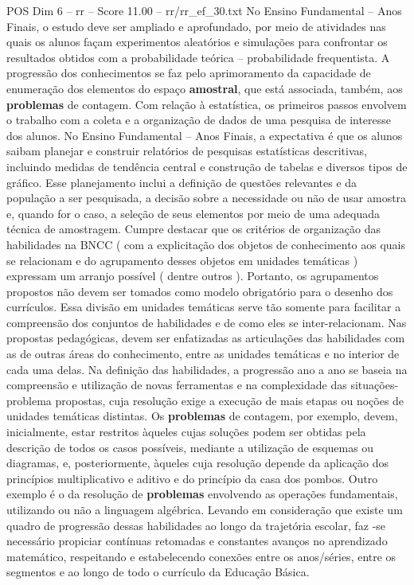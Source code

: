 \begin{textsample}{POS Dim 6 – rr – Score 11.00 – rr/rr\_ef\_30.txt}
No Ensino Fundamental – Anos Finais, o estudo deve ser ampliado e aprofundado, por meio de atividades nas quais os alunos façam experimentos aleatórios e simulações para confrontar os resultados obtidos com a probabilidade teórica – probabilidade frequentista.
A progressão dos conhecimentos se faz pelo aprimoramento da capacidade de enumeração dos elementos do espaço \textbf{amostral}, que está associada, também, aos \textbf{problemas} de contagem.
Com relação à estatística, os primeiros passos envolvem o trabalho com a coleta e a organização de dados de uma pesquisa de interesse dos alunos.
No Ensino Fundamental – Anos Finais, a expectativa é que os alunos saibam planejar e construir relatórios de pesquisas estatísticas descritivas, incluindo medidas de tendência central e construção de tabelas e diversos tipos de gráfico.
Esse planejamento inclui a definição de questões relevantes e da população a ser pesquisada, a decisão sobre a necessidade ou não de usar amostra e, quando for o caso, a seleção de seus elementos por meio de uma adequada técnica de amostragem.
Cumpre destacar que os critérios de organização das habilidades na BNCC ( com a explicitação dos objetos de conhecimento aos quais se relacionam e do agrupamento desses objetos em unidades temáticas ) expressam um arranjo possível ( dentre outros ).
Portanto, os agrupamentos propostos não devem ser tomados como modelo obrigatório para o desenho dos currículos.
Essa divisão em unidades temáticas serve tão somente para facilitar a compreensão dos conjuntos de habilidades e de como eles se inter-relacionam.
Nas propostas pedagógicas, devem ser enfatizadas as articulações das habilidades com as de outras áreas do conhecimento, entre as unidades temáticas e no interior de cada uma delas.
Na definição das habilidades, a progressão ano a ano se baseia na compreensão e utilização de novas ferramentas e na complexidade das situações-problema propostas, cuja resolução exige a execução de mais etapas ou noções de unidades temáticas distintas.
Os \textbf{problemas} de contagem, por exemplo, devem, inicialmente, estar restritos àqueles cujas soluções podem ser obtidas pela descrição de todos os casos possíveis, mediante a utilização de esquemas ou diagramas, e, posteriormente, àqueles cuja resolução depende da aplicação dos princípios multiplicativo e aditivo e do princípio da casa dos pombos.
Outro exemplo é o da resolução de \textbf{problemas} envolvendo as operações fundamentais, utilizando ou não a linguagem algébrica.
Levando em consideração que existe um quadro de progressão dessas habilidades ao longo da trajetória escolar, faz -se necessário propiciar contínuas retomadas e constantes avanços no aprendizado matemático, respeitando e estabelecendo conexões entre os anos/séries, entre os segmentos e ao longo de todo o currículo da Educação Básica.

\end{textsample}
